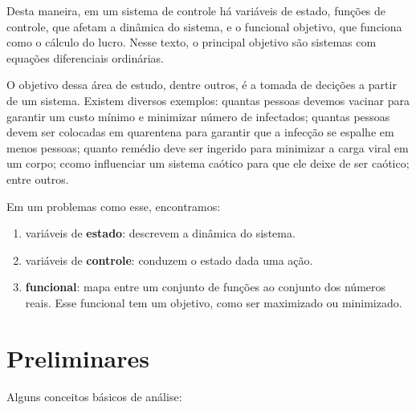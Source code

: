 Desta maneira, em um sistema de controle há variáveis de estado, funções de
controle, que afetam a dinâmica do sistema, e o funcional objetivo, que
funciona como o cálculo do lucro. Nesse texto, o principal objetivo são
sistemas com equações diferenciais ordinárias. 

O objetivo dessa área de estudo, dentre outros, é a tomada de decições a
partir de um sistema. Existem diversos exemplos: quantas pessoas devemos
vacinar para garantir um custo mínimo e minimizar número de infectados;
quantas pessoas devem ser colocadas em quarentena para garantir que a infecção
se espalhe em menos pessoas; quanto remédio deve ser ingerido para minimizar a
carga viral em um corpo; ccomo influenciar um sistema caótico para que ele
deixe de ser caótico; entre outros. 

Em um problemas como esse, encontramos: 
\begin{enumerate}
    \item variáveis de \textbf{estado}: descrevem a dinâmica do sistema. 
    \item variáveis de \textbf{controle}: conduzem o estado dada uma ação. 
    \item \textbf{funcional}: mapa entre um conjunto de funções ao
    conjunto dos números reais. Esse funcional tem um objetivo, como ser
    maximizado ou minimizado.  
\end{enumerate}

\section{Preliminares}

Alguns conceitos básicos de análise: 

